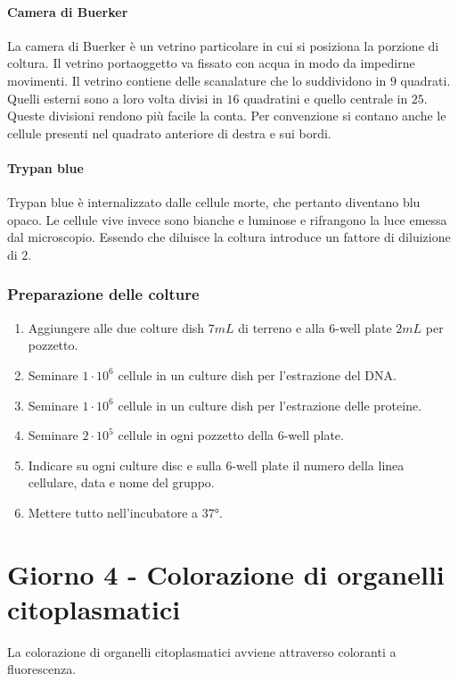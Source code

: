 			\paragraph{Camera di Buerker}
			La camera di Buerker \`e un vetrino particolare in cui si posiziona la porzione di coltura. 
			Il vetrino portaoggetto va fissato con acqua in modo da impedirne movimenti.
			Il vetrino contiene delle scanalature che lo suddividono in $9$ quadrati.
			Quelli esterni sono a loro volta divisi in $16$ quadratini e quello centrale in $25$.
			Queste divisioni rendono pi\`u facile la conta.
			Per convenzione si contano anche le cellule presenti nel quadrato anteriore di destra e sui bordi.

			\paragraph{Trypan blue}
			Trypan blue \`e internalizzato dalle cellule morte, che pertanto diventano blu opaco. 
			Le cellule vive invece sono bianche e luminose e rifrangono la luce emessa dal microscopio.
			Essendo che diluisce la coltura introduce un fattore di diluizione di $2$.
		
		\subsubsection{Preparazione delle colture}
		\begin{enumerate}
			\item Aggiungere alle due colture dish $7\si{mL}$ di terreno e alla $6$-well plate $2\si{mL}$ per pozzetto.
			\item Seminare $1\cdot 10^6$ cellule in un culture dish per l'estrazione del DNA.
			\item Seminare $1\cdot 10^6$ cellule in un culture dish per l'estrazione delle proteine.
			\item Seminare $2\cdot 10^5$ cellule in ogni pozzetto della $6$-well plate.
			\item Indicare su ogni culture disc e sulla $6$-well plate il numero della linea cellulare, data e nome del gruppo.
			\item Mettere tutto nell'incubatore a $37\si{\degree}$.
		\end{enumerate}




\section{Giorno 4 - Colorazione di organelli citoplasmatici}
La colorazione di organelli citoplasmatici avviene attraverso coloranti a fluorescenza.

